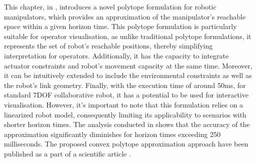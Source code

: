 
This chapter, in , introduces a novel polytope formulation for robotic manipulators, which provides an approximation of the manipulator's reachable space within a given horizon time. This polytope formulation is particularly suitable for operator visualisation, as unlike traditional polytope formulations, it represents the set of robot's reachable positions, thereby simplifying interpretation for operators. Additionally, it has the capacity to integrate actuator constraints and robot's movement capacity at the same time. Moreover, it can be intuitively extended to include the environmental constraints as well as the robot's link geometry. Finally, with the execution time of around 50ms, for standard 7DOF collaborative robot, it has a potential to be used for interactive visualisation. 
However, it's important to note that this formulation relies on a linearized robot model, consequently limiting its applicability to scenarios with shorter horizon times. The analysis conducted in  shows that the accuracy of the approximation significantly diminishes for horizon times exceeding 250 milliseconds. 
The proposed convex polytope approximation approach have been published as a part of a scientific article \citet{Skuric2022hfr}.

